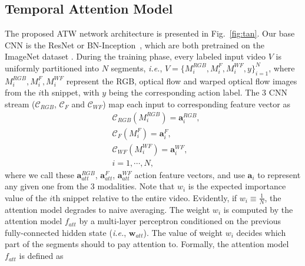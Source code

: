 \documentclass[runningheads,a4paper]{llncs}
\begin{document}
\subsection{Temporal Attention Model}
%
The proposed ATW network architecture is presented in Fig.~\ref{fig:tan}. Our base CNN is the ResNet \cite{he2016deep}
or BN-Inception~\cite{ioffe2015batch}, which are both pretrained on the ImageNet dataset \cite{deng2009imagenet}. During
the training phase, every labeled input video $V$ is uniformly partitioned into $N$ segments, {\em i.e.},
$V=\{M_i^{RGB}, M_i^{F}, M_i^{WF}, y\}_{i=1}^N$, where $M_i^{RGB}, M_i^{F}, M_i^{WF}$ represent the RGB, optical flow and
warped optical flow images from the $i$th snippet, with $y$ being the corresponding action label. The $3$ CNN stream
($\mathcal{C}_{RGB}$, $\mathcal{C}_F$ and $\mathcal{C}_{WF}$) map each input to corresponding feature vector as
\begin{equation}
\begin{split}
&\mathcal{C}_{RGB}(M_i^{RGB}) = \mathbf{a}_i^{RGB}, \\
&\mathcal{C}_{F}(M_i^{F}) = \mathbf{a}_i^{F}, \\
&\mathcal{C}_{WF}(M_i^{WF}) =  \mathbf{a}_i^{WF}, \\
&i = 1, \cdots, N,
\end{split}
\end{equation}
where we call these $\mathbf{a}_{att}^{RGB}$, $\mathbf{a}_{att}^{F}$, $\mathbf{a}_{att}^{WF}$ action feature
vectors, and use $\mathbf{a}_i$ to represent any given one from the 3 modalities. Note that $w_i$ is the expected importance
value of the $i$th snippet relative to the entire video. Evidently, if $w_i \equiv \frac{1}{N}$, the attention model degrades
to naive averaging. The weight $w_i$ is computed by the attention model $f_{att}$ by a multi-layer perceptron conditioned on
the previous fully-connected hidden state ({\em i.e.}, $\mathbf{w}_{att}$). The value of weight $w_i$ decides which part of the
segments should to pay attention to. Formally, the attention model $f_{att}$ is defined as
\end{document}
